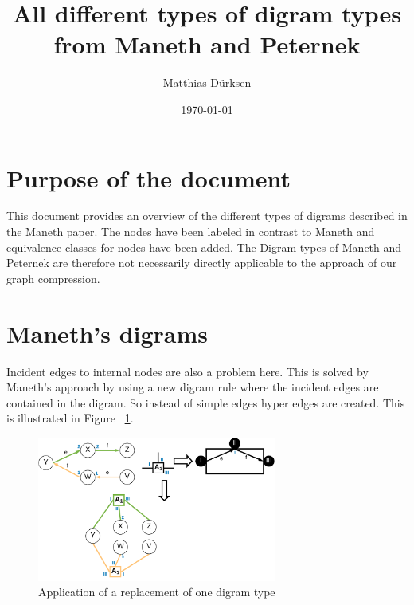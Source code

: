 \documentclass[a4paper]{scrartcl}
\title{All different types of digram types from Maneth and Peternek}
\author{Matthias Dürksen}
\date{\today}
\begin{document}
\maketitle
\section*{Purpose of the document}
This document provides an overview of the different types of digrams described in the Maneth paper.
The nodes have been labeled in contrast to Maneth and equivalence classes for nodes have been added. The Digram types of Maneth and Peternek are therefore not necessarily directly applicable to the approach of our graph compression.

\section{Maneth's digrams}


Incident edges to internal nodes are also a problem here. This is solved by Maneth's approach by using a new digram rule where the incident edges are contained in the digram. So instead of simple edges hyper edges are created. This is illustrated in Figure ~\ref{fig:type1}.




    

\begin{figure}[h]
	\centering
	\includegraphics[width=0.7\textwidth]{img/type1}
	\caption{Application of a replacement of one digram type}
	\label{fig:type1}
\end{figure}
\end{document}
